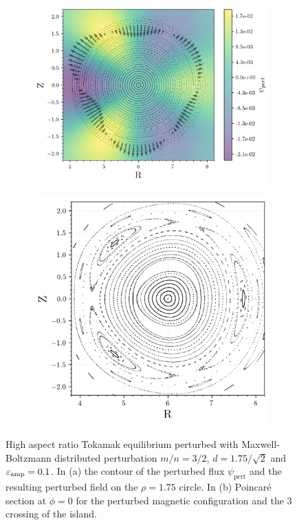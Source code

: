 \begin{figure}[H]
    \centering
    \begin{subfigure}[t]{0.55\textwidth}
        \centering
        \includegraphics[width=\textwidth]{images/high-aspect-ratio/psi_pert.png}
        \caption{}
        \label{fig:toyha-32-psi}
    \end{subfigure}
    \hfill
    \begin{subfigure}[t]{0.43\textwidth}
        \centering
        \includegraphics[width=\textwidth]{images/high-aspect-ratio/perturbed_3_2.png}
        \caption{}
        \label{fig:toyha-32-p}
    \end{subfigure}
    \caption{High aspect ratio Tokamak equilibrium perturbed with Maxwell-Boltzmann distributed perturbation $m/n = 3/2$, $d = 1.75/\sqrt{2}$ and $\varepsilon_\text{amp} = 0.1$. In (a) the contour of the perturbed flux $\psi_\text{pert}$ and the resulting perturbed field on the $\rho=1.75$ circle. In (b) Poincaré section at $\phi = 0$ for the perturbed magnetic configuration and the 3 crossing of the island.}
    \label{fig:toyha-32}
\end{figure}

